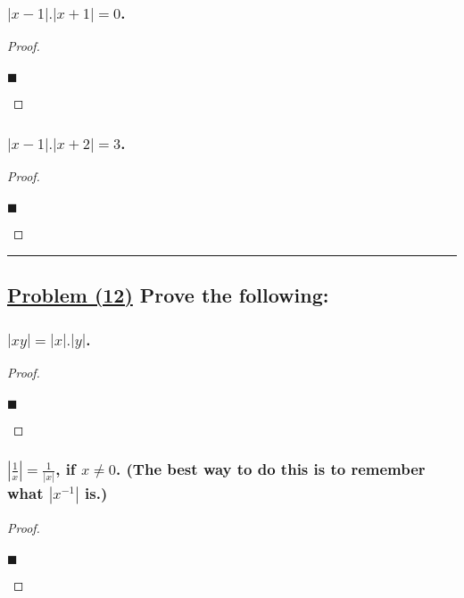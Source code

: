 \documentclass[letterpaper, 10 pt, conference]{ieeeconf}  %
\begin{document}
\subsubsection{\textbf{$\left\lvert x - 1 \right\rvert . \left\lvert x + 1 \right\rvert  = 0$.}}
\begin{proof}
\begin{align}
    
\end{align}
\begin{flushright}
$\blacksquare$
\end{flushright}
\end{proof}

\subsubsection{\textbf{$\left\lvert x - 1 \right\rvert . \left\lvert x + 2 \right\rvert = 3$.}}
\begin{proof}
\begin{align}
    
\end{align}
\begin{flushright}
$\blacksquare$
\end{flushright}
\end{proof}

\noindent\rule{8cm}{0.4pt}
\subsection{\textbf{\underline{Problem (12)} Prove the following:}}

\subsubsection{\textbf{$\left\lvert xy  \right\rvert = \left\lvert x \right\rvert . \left\lvert y \right\rvert$.}}
\begin{proof}
\begin{align}
    
\end{align}
\begin{flushright}
$\blacksquare$
\end{flushright}
\end{proof}

\subsubsection{\textbf{$\left\lvert \frac{1}{x} \right\rvert = \frac{1}{\left\lvert x \right\rvert}$, if $x \neq 0 $. (The best way to do this is to remember what $\left\lvert x^{-1}\right\rvert$ is.)}}
\begin{proof}
\begin{align}
    
\end{align}
\begin{flushright}
$\blacksquare$
\end{flushright}
\end{proof}
\end{document}
